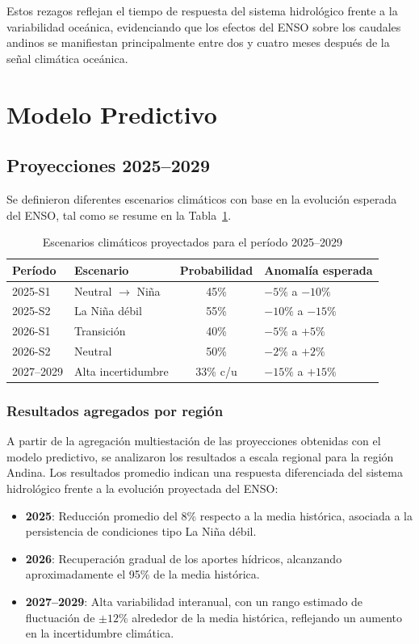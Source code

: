 Estos rezagos reflejan el tiempo de respuesta del sistema hidrológico frente a la variabilidad oceánica, evidenciando que los efectos del ENSO sobre los caudales andinos se manifiestan principalmente entre dos y cuatro meses después de la señal climática oceánica.


\section{Modelo Predictivo}
\label{sec:chp6-3}
\subsection{Proyecciones 2025--2029}

Se definieron diferentes escenarios climáticos con base en la evolución esperada del ENSO, tal como se resume en la Tabla~\ref{tab:escenarios_futuros}.

\begin{table}[H]
\centering
\caption{Escenarios climáticos proyectados para el período 2025--2029}
\label{tab:escenarios_futuros}
\begin{tabular}{l l c l}
\hline
\textbf{Período} & \textbf{Escenario} & \textbf{Probabilidad} & \textbf{Anomalía esperada} \\
\hline
2025-S1 & Neutral $\rightarrow$ Niña & 45\% & $-5\%$ a $-10\%$ \\
2025-S2 & La Niña débil & 55\% & $-10\%$ a $-15\%$ \\
2026-S1 & Transición & 40\% & $-5\%$ a $+5\%$ \\
2026-S2 & Neutral & 50\% & $-2\%$ a $+2\%$ \\
2027--2029 & Alta incertidumbre & 33\% c/u & $-15\%$ a $+15\%$ \\
\hline
\end{tabular}
\end{table}
\subsubsection{Resultados agregados por región}

A partir de la agregación multiestación de las proyecciones obtenidas con el modelo predictivo, se analizaron los resultados a escala regional para la región Andina. Los resultados promedio indican una respuesta diferenciada del sistema hidrológico frente a la evolución proyectada del ENSO:

\begin{itemize}
    \item \textbf{2025}: Reducción promedio del 8\% respecto a la media histórica, asociada a la persistencia de condiciones tipo La Niña débil.
    \item \textbf{2026}: Recuperación gradual de los aportes hídricos, alcanzando aproximadamente el 95\% de la media histórica.
    \item \textbf{2027--2029}: Alta variabilidad interanual, con un rango estimado de fluctuación de $\pm 12\%$ alrededor de la media histórica, reflejando un aumento en la incertidumbre climática.
\end{itemize}

